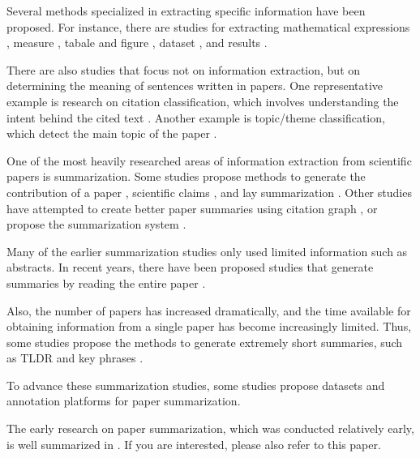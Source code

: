 Several methods specialized in extracting specific information have been proposed. For instance, there are studies for extracting mathematical expressions \cite{greiner2020math,madisetty2021neural}, measure \cite{harper2021semeval,kohler2021s}, tabale and figure \cite{shen2022vila,hashmi2021current,zhuang2022resel,yamamoto2021visual}, dataset \cite{hou2019identification,kumar2021dataquest,prasad2019dataset}, and results \cite{kardas2020axcell}.

There are also studies that focus not on information extraction, but on determining the meaning of sentences written in papers. One representative example is research on citation classification, which involves understanding the intent behind the cited text \cite{pride2019act,kunnath2021meta,kunnath2022dynamic,kunnath2022act2,lauscher2021multicite}. Another example is topic/theme classification, which detect the main topic of the paper \cite{sadat2022hierarchical,mendoza2022benchmark,salatino2022cso}.

One of the most heavily researched areas of information extraction from scientific papers is summarization. Some studies propose methods to generate the contribution of a paper \cite{hayashi2020s}, scientific claims \cite{wright2022generating}, and lay summarization \cite{goldsack2022making}. Other studies have attempted to create better paper summaries using citation graph \cite{chen2022scientific,an2021enhancing}, or propose the summarization system \cite{erera2019summarization}.

Many of the earlier summarization studies only used limited information such as abstracts. In recent years, there have been proposed studies that generate summaries by reading the entire paper \cite{subramanian2019extractive,qi2022sapgraph,dong2020discourse,tretyak2020combination}.

Also, the number of papers has increased dramatically, and the time available for obtaining information from a single paper has become increasingly limited. Thus, some studies propose the methods to generate extremely short summaries, such as TLDR \cite{cachola2020tldr} and key phrases \cite{boudin2021keyphrase,garg2021keyphrase}.

To advance these summarization studies, some studies propose datasets \cite{yasunaga2019scisummnet,bastan2022sume} and annotation platforms \cite{el2022platform} for paper summarization. 

The early research on paper summarization, which was conducted relatively early, is well summarized in \cite{altmami2022automatic}. If you are interested, please also refer to this paper.

